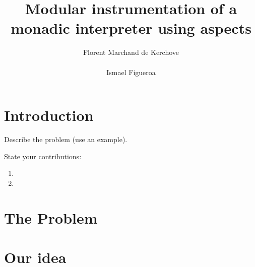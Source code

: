 \documentclass{acm_proc_article-sp}
\begin{document}
\title{Modular instrumentation of a monadic interpreter using aspects}

\author{
%
%
\alignauthor
Florent Marchand de Kerchove\\
       \\
\alignauthor
Ismael Figueroa\\
}

\maketitle
\begin{abstract}
\end{abstract}




\section{Introduction}
Describe the problem (use an example).

State your contributions:
\begin{enumerate}
\item
\item
\end{enumerate}

\section{The Problem}

\section{Our idea}
\end{document}
